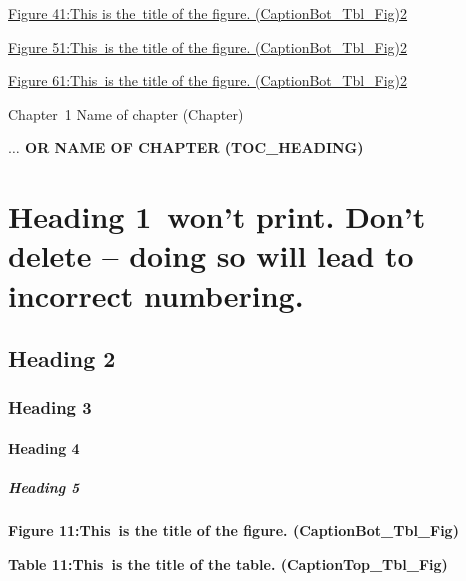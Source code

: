 \documentclass[12pt]{report}
\begin{document}
\begin{FlushLeft}
\href{}{Figure 41:This is the\ title of the figure.  (CaptionBot\_Tbl\_Fig)2}
\end{FlushLeft}\par

\begin{FlushLeft}
\href{}{Figure 51:This\ is the title of the figure.  (CaptionBot\_Tbl\_Fig)2}
\end{FlushLeft}\par

\begin{FlushLeft}
\href{}{Figure 61:This\ is the title of the figure.  (CaptionBot\_Tbl\_Fig)2}
\end{FlushLeft}\par


\vspace{\baselineskip}

\vspace{\baselineskip}
Chapter\ 1  Name of chapter (Chapter)\par

\begin{FlushLeft}
{\fontsize{14pt}{16.8pt}\selectfont \textbf{\uppercase{$ \ldots $ or Name of Chapter (TOC\_HEADING)}}\par}
\end{FlushLeft}\par

\section*{Heading 1\ won’t print.  Don’t delete – doing so will lead to incorrect numbering.}
\subsection*{Heading 2}
\subsubsection*{Heading 3}
\paragraph*{Heading 4}
\subparagraph*{Heading 5}
\begin{FlushLeft}
\textbf{Figure 11:\tab This\ is the title of the figure.  (CaptionBot\_Tbl\_Fig)}
\end{FlushLeft}\par

\begin{FlushLeft}
\textbf{Table 11:\tab This\ is the title of the table.  (CaptionTop\_Tbl\_Fig)}
\end{FlushLeft}\par
\end{document}
